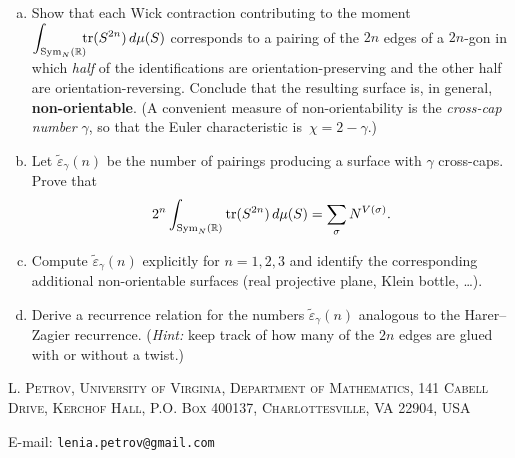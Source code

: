 \documentclass[letterpaper,11pt,oneside,reqno]{book}
\numberwithin{equation}{chapter}  %
\theoremstyle{definition}
\begin{document}
\begin{enumerate}[(a)]
  \item
  Show that each Wick contraction contributing to the moment
  $\displaystyle\int_{\operatorname{Sym}_{N}(\Bbb R)}\!\!\!\operatorname{tr}(S^{2n})\,d\mu(S)$
  corresponds to a pairing of the $2n$ edges of a $2n$-gon in which
  \emph{half} of the identifications are orientation-preserving and the
  other half are orientation-reversing.  Conclude that the resulting
  surface is, in general, \textbf{non-orientable}.
  (A convenient measure of non-orientability is the \emph{cross-cap number}
  $\gamma$, so that the Euler characteristic is $\,\chi=2-\gamma$.)

  \item
  Let $\tilde\varepsilon_\gamma(n)$ be the number of pairings producing a
  surface with $\gamma$ cross-caps.
  Prove that
  \[
    2^n\int_{\operatorname{Sym}_{N}(\Bbb R)}\operatorname{tr}(S^{2n})\,d\mu(S)
		=
		\sum_{\sigma}N^{V(\sigma)}.
  \]

  \item
  Compute $\tilde\varepsilon_\gamma(n)$ explicitly for $n=1,2,3$
  and identify the corresponding additional non-orientable surfaces
  (real projective plane, Klein bottle, \dots).

  \item
  Derive a recurrence relation for the numbers $\tilde\varepsilon_\gamma(n)$
	analogous to the Harer–Zagier recurrence.
  (\emph{Hint:} keep track of how
  many of the $2n$ edges are glued with or without a twist.)
\end{enumerate}


















\medskip

\textsc{L. Petrov, University of Virginia, Department of Mathematics, 141 Cabell Drive, Kerchof Hall, P.O. Box 400137, Charlottesville, VA 22904, USA}

E-mail: \texttt{lenia.petrov@gmail.com}
\end{document}
